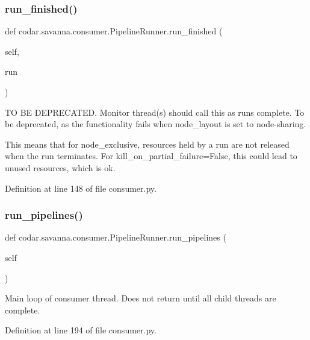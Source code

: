 \subsubsection{\texorpdfstring{run\+\_\+finished()}{run\_finished()}}
{\footnotesize\ttfamily def codar.\+savanna.\+consumer.\+Pipeline\+Runner.\+run\+\_\+finished (\begin{DoxyParamCaption}\item[{}]{self,  }\item[{}]{run }\end{DoxyParamCaption})}

\begin{DoxyVerb}TO BE DEPRECATED.
Monitor thread(s) should call this as runs
complete. To be deprecated, as the functionality fails when
node_layout is set to node-sharing.

This means that for node_exclusive, resources held by a run are not
released when the run terminates. For kill_on_partial_failure=False,
this could lead to unused resources, which is ok.\end{DoxyVerb}
 

Definition at line 148 of file consumer.\+py.

\mbox{\label{classcodar_1_1savanna_1_1consumer_1_1_pipeline_runner_af1fe6b71b44a5e849052a36643444db3}} 
\subsubsection{\texorpdfstring{run\+\_\+pipelines()}{run\_pipelines()}}
{\footnotesize\ttfamily def codar.\+savanna.\+consumer.\+Pipeline\+Runner.\+run\+\_\+pipelines (\begin{DoxyParamCaption}\item[{}]{self }\end{DoxyParamCaption})}

\begin{DoxyVerb}Main loop of consumer thread. Does not return until all child
threads are complete.\end{DoxyVerb}
 

Definition at line 194 of file consumer.\+py.

